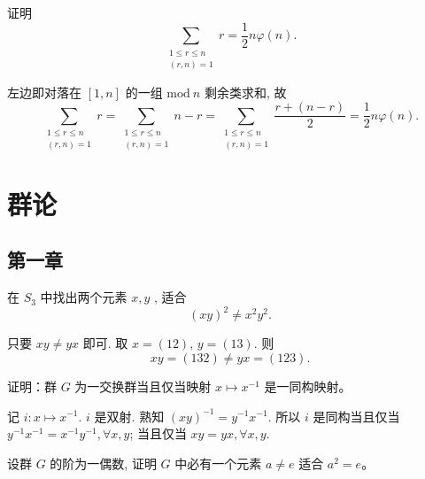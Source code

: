 \begin{problem}
    证明 
        \[
            \sum_{\substack{1\leq r\leq n\\ (r,n)=1}}^{}r=\frac{1}{2}n\varphi(n).
        \]
\end{problem}

\begin{solution}
    左边即对落在 $[1,n]$ 的一组 $\mathrm{mod}\ n$ 剩余类求和, 故
        \[
            \sum_{\substack{1\leq r\leq n\\ (r,n)=1}}^{}r=\sum_{\substack{1\leq r\leq n\\ (r,n)=1}}^{}n-r=\sum_{\substack{1\leq r\leq n\\ (r,n)=1}}^{}\frac{r+(n-r)}{2}=\frac{1}{2}n\varphi(n).
        \]
\end{solution}

\section{群论}
\subsection{第一章}

\setcounter{pb}{5}

\begin{problem}
    在  $S_3$ 中找出两个元素 $x,y$ , 适合  
    \[
        (xy)^2 \neq x^2 y^2.
    \]
\end{problem}

\begin{solution}
    只要 $x y\neq y x$ 即可. 取 $x=(1 2)$, $y=(1 3)$. 则 
        \[
            x y=(1 3 2)\ne y x = (1 2 3).
        \]
\end{solution}

\setcounter{pb}{8}

\begin{problem}
    证明：群 $G$ 为一交换群当且仅当映射 $x \mapsto x^{-1}$ 是一同构映射。
\end{problem}

\begin{solution}
    记 $i\colon x\mapsto x^{-1}$. $i$ 是双射. 熟知 $( x y)^{-1}=y ^{-1} x^{-1}$. 所以 $i$ 是同构当且仅当 $y^{-1}x^{-1}=x^{-1}y^{-1},\forall x,y$; 当且仅当 $x y=y x,\forall x,y$.
\end{solution}

\setcounter{pb}{13}

\begin{problem}
    设群 $G$ 的阶为一偶数, 证明 $G$ 中必有一个元素 $a \neq e$ 适合 $a^2 = e$。  
\end{problem}


